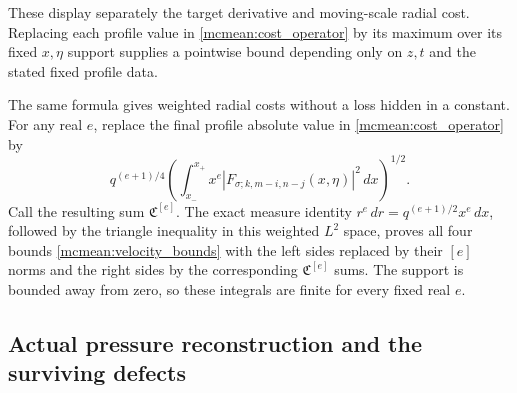 These display separately the target derivative and moving-scale radial
cost. Replacing each profile value in \eqref{mcmean:cost_operator}
by its maximum over its fixed \(x,\eta\) support supplies a pointwise
bound depending only on \(z,t\) and the stated fixed profile data.

The same formula gives weighted radial costs without a loss hidden in
a constant. For any real \(e\), replace the final profile absolute
value in \eqref{mcmean:cost_operator} by
\[
 q^{(e+1)/4}
 \left(\int_{x_-}^{x_+}x^e
          |F_{\sigma;k,m-i,n-j}(x,\eta)|^2\,dx\right)^{1/2}.
\]
Call the resulting sum \(\mathfrak C^{[e]}\). The exact measure
identity \(r^e\,dr=q^{(e+1)/2}x^e\,dx\), followed by the triangle
inequality in this weighted \(L^2\) space, proves all four bounds
\eqref{mcmean:velocity_bounds} with the left sides replaced by their
\([e]\) norms and the right sides by the corresponding
\(\mathfrak C^{[e]}\) sums. The support is bounded away from zero,
so these integrals are finite for every fixed real \(e\).

\subsection{Actual pressure reconstruction and the surviving defects}

